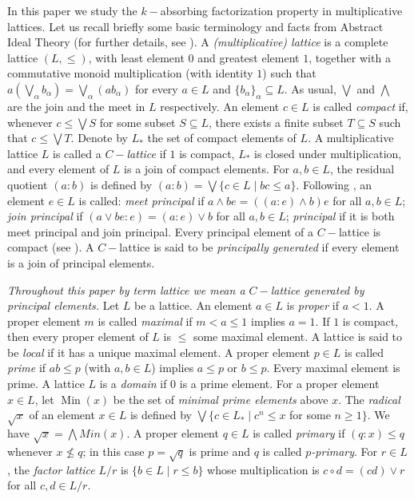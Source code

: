 \documentclass{amsart}
\theoremstyle{plain}
\theoremstyle{definition}
\theoremstyle{remark}
\begin{document}
In this  paper we 
study the $k-$absorbing  factorization property in multiplicative lattices. 
Let us recall briefly some basic terminology and facts from Abstract Ideal Theory (for further details, see \cite{A,AJ,AJ1,D,JJ}). 
A \emph{(multiplicative) lattice} is a complete lattice $(L,\leq)$, with least element $0$ and greatest element $1$, together with a commutative monoid   multiplication (with identity $1$) such that 
$ a\left(\bigvee_{\alpha}b_{\alpha}\right) =\bigvee_{\alpha}(ab_{\alpha})$  
 for every $a\in L$ and $\{b_{\alpha}\}_{\alpha}\subseteq L$. 
 As usual,  $\bigvee$  and $\bigwedge$ are the join and the meet in $L$ respectively.
 An element $c\in L$ is called \emph{compact} if, whenever $ c\leq\bigvee S $ for some subset $S\subseteq L$, there exists a finite subset $T\subseteq S$ such that $ c\leq\bigvee T. $ 
Denote by $L_\ast$ the set of compact elements of $L$. 
 A multiplicative lattice $L$ is called a \emph{$C-$lattice} if $1$ is compact, $L_\ast$ is closed under multiplication, and every element of $L$ is a join of compact elements. 
For $a,b\in L$, the residual quotient $(a:b)$ is defined by  $(a:b)=\bigvee\{c\in L\mid bc\leq a\}. $  Following \cite{D}, an element $e\in L$ is called: 
\emph{meet principal} if $a\wedge be=((a:e)\wedge b)e $ for all $a,b\in L$; 
\emph{join principal} if $(a\vee be:e)=(a:e)\vee b $ for all $a,b\in L$;
\emph{principal} if it is both meet principal and join principal. 
Every principal element of a $C-$lattice is compact (see \cite[Theorem 1.3]{A}). 
A $C-$lattice is said to be \emph{principally generated} if every element is a join of principal elements. 
 
 

 {\em Throughout this paper by term {\em lattice} we mean   a $C-$lattice generated by principal elements. }     
Let $L$ be a lattice. 
An element $a\in L$ is \emph{proper} if $a<1$. A proper element $m$ is called \emph{maximal} if $ m<a\leq 1 $ implies  $a=1$. If $1$ is compact, then every proper element of $L$ is $\leq $ some maximal element. 
A lattice is said to be   \emph{local} if it has a unique maximal element. 
A proper element $p\in L$ is called \emph{prime} if $ ab\leq p $ (with $a,b\in L$) implies   $a\leq p$ or $b\leq p$. 
Every maximal element is prime. 
A lattice $L$  is a \emph{domain} if $0$ is a prime element. 
For a proper element $x\in L$, let $\operatorname{Min}(x)$
be the set of {\em minimal prime elements} above $x$.
The \emph{radical} $\sqrt{x}$ of an element $x\in L$ is defined by  
$\bigvee\{c\in L_\ast\mid c^n\leq x$ for some $n\geq 1 \}.$
We have $\sqrt{x}=\bigwedge Min(x)$.      
A proper element $q\in L$ is called \emph{primary} if $(q:x)\leq q$ whenever $x\not\leq q$; in this case $p=\sqrt{q}$ is prime and $q$ is called {\em $p$-primary}.
For $r\in L$, the {\em factor lattice} $L/r$ is $\{b\in L\mid r\leq b\}$ whose  multiplication is $ c\circ d=(cd)\vee r $ for all $c,d\in L/r$. 
\end{document}
